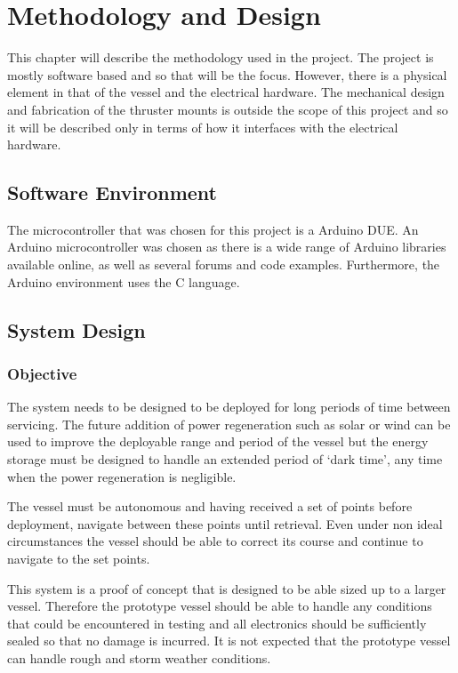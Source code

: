 \chapter{Methodology and Design}
This chapter will describe the methodology used in the project. The project is mostly software based and so that will be the focus. However, there is a physical element in that of the vessel and the electrical hardware. The mechanical design and fabrication of the thruster mounts is outside the scope of this project and so it will be described only in terms of how it interfaces with the electrical hardware.\par
\section{Software Environment}
The microcontroller that was chosen for this project is a Arduino DUE. An Arduino microcontroller was chosen as there is a wide range of Arduino libraries available online, as well as several forums and code examples. Furthermore, the Arduino environment uses the C language. \par
\section{System Design}
	\subsection{Objective}
	The system needs to be designed to be deployed for long periods of time between servicing. The future addition of power regeneration such as solar or wind can be used to improve the deployable range and period of the vessel but the energy storage must be designed to handle an extended period of ‘dark time’, any time when the power regeneration is negligible. \par
	The vessel must be autonomous and having received a set of points before deployment, navigate between these points until retrieval. Even under non ideal circumstances the vessel should be able to correct its course and continue to navigate to the set points. \par
	This system is a proof of concept that is designed to be able sized up to a larger vessel. Therefore the prototype vessel should be able to handle any conditions that could be encountered in testing and all electronics should be sufficiently sealed so that no damage is incurred. It is not expected that the prototype vessel can handle rough and storm weather conditions.\par
